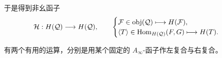 于是得到非幺函子
\begin{equation}\label{eq:2.18}
  \mathcal H:H(\mathcal Q)\longrightarrow H(\mathcal Q),\qquad
  \begin{cases}
    \mathcal F\in\operatorname{obj}(\mathcal Q)\longmapsto H(\mathcal F),\\
    \langle T\rangle\in\operatorname{Hom}_{H(\mathcal Q)}(F,G)\longmapsto H(T).
  \end{cases}
\end{equation}

有两个有用的运算，分别是用某个固定的 $A_\infty$-函子作左复合与右复合。

